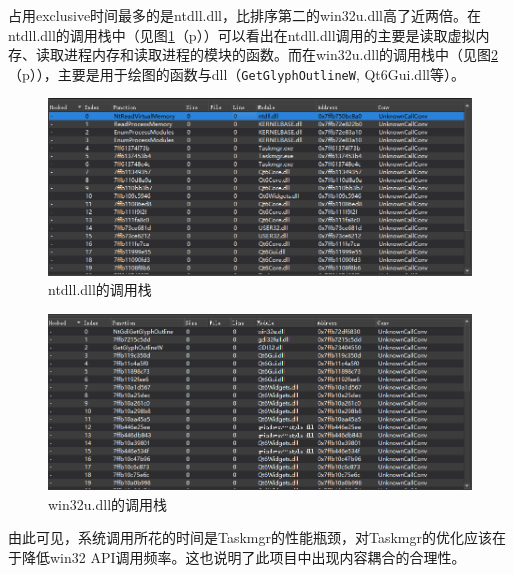 \documentclass[UTF8,twoside,titlepage]{ctexart}
\newcommand\code[1]{\texttt{#1}}
\newcommand\myref[1]{\ref{#1}（p\pageref{#1}）}
\begin{document}
占用exclusive时间最多的是ntdll.dll，比排序第二的win32u.dll高了近两倍。在ntdll.dll的调用栈中（见图\myref{fig:qorbit.1}）可以看出在ntdll.dll调用的主要是读取虚拟内存、读取进程内存和读取进程的模块的函数。而在win32u.dll的调用栈中（见图\myref{fig:qorbit.2}），主要是用于绘图的函数与dll（\code{GetGlyphOutlineW}, Qt6Gui.dll等）。

\begin{figure}[H]
    \centering
    \includegraphics[scale=0.6]{../media/performance analyze/14.878s sampling result 1 callstuck.png}
    \caption{ntdll.dll的调用栈}
    \label{fig:qorbit.1}
\end{figure}

\begin{figure}[H]
    \centering
    \includegraphics[scale=0.45]{../media/performance analyze/14.878s sampling result 2 callstuck.png}
    \caption{win32u.dll的调用栈}
    \label{fig:qorbit.2}
\end{figure}

由此可见，系统调用所花的时间是Taskmgr的性能瓶颈，对Taskmgr的优化应该在于降低win32 API调用频率。这也说明了此项目中出现内容耦合的合理性。
\end{document}
